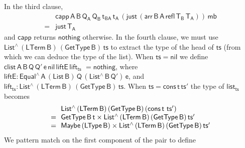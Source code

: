 \documentclass[sigplan,10pt,anonymous,review]{acmart}
\begin{document}
In the third clause,
\[\begin{array}{ll}
 & \!\!\mathsf{capp\, A \,B \, Q_A \, Q_B \, t_{BA}\, t_A \, (just \,
  (arr\, B \,A\, refl\, T_B\, T_A))\, mb}\\ 
= & \!\!\mathsf{just\, T_A}
\end{array}\]
and $\mathsf{capp}$ returns $\mathsf{nothing}$ otherwise.  In the
fourth clause, we must use $\mathsf{List^{\wedge}\, (LTerm\, B)\,
  (GetType\, B)\, ts}$ to extract the type of the head of
$\mathsf{ts}$ (from which we can deduce the type of the list). When
$\mathsf{ts} = \mathsf{nil}$ we define $\mathsf{clist\, A\, B\, Q\,
  Q'\, e\, nil \, liftE\, lift_{ts}}$ $\mathsf{= nothing}$, where
$\mathsf{liftE : Equal^{\wedge}\, A\, (List\,B) \, Q\,
  (List^{\wedge}\, B\, Q')\, e}$, and $\mathsf{lift_{ts} :
  List^{\wedge}\, (LTerm\, B)\, (GetType\, B)\, ts}$.  When
$\mathsf{ts} = \mathsf{cons\,t\,ts'}$
the type of $\mathsf{list_{ts}}$ becomes
\[\begin{array}{ll}
& \!\!\mathsf{List^{\wedge}\, (LTerm\, B)\, (GetType\, B)\, (cons\, t}$
$\mathsf{ts')}\\
= & \!\!\mathsf{GetType\, B\, t \times List^{\wedge}\, (LTerm\, B)\,
  (GetType\, B)\, ts'}\\
= & \!\! \mathsf{Maybe\, (LType\, B) \times List^{\wedge}\, (LTerm\, B)\,
  (GetType\, B)\, ts'}
\end{array}\] We pattern match on the first component
of the pair to define
\end{document}
